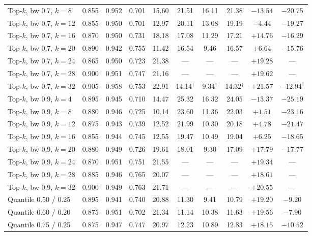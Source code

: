 \documentclass[12pt,parskip = half, DIV=classic,listof=totoc]{scrartcl}
\begin{document}
\begin{table}[htbp]
\begin{tabular}{@{}lccccccccc@{}}
						Top-$k$, bw 0.7, $k=8$ & 0.855 & 0.952 & 0.701 & 15.60 & 21.51 & 16.11 & 21.38 & $-13.54$ & $-20.75$ \\
						Top-$k$, bw 0.7, $k=12$ & 0.855 & 0.950 & 0.701 & 12.97 & 20.11 & 13.08 & 19.19 & $-4.44$ & $-19.27$ \\
						Top-$k$, bw 0.7, $k=16$ & 0.870 & 0.950 & 0.731 & 18.18 & 17.08 & 11.29 & 17.21 & $+14.76$ & $-16.29$ \\
						Top-$k$, bw 0.7, $k=20$ & 0.890 & 0.942 & 0.755 & 11.42 & 16.54 & 9.46 & 16.57 & $+6.64$ & $-15.76$ \\
						Top-$k$, bw 0.7, $k=24$ & 0.865 & 0.950 & 0.723 & 21.38 & --- & --- & --- & $+19.28$ & --- \\
						Top-$k$, bw 0.7, $k=28$ & 0.900 & 0.951 & 0.747 & 21.16 & --- & --- & --- & $+19.62$ & --- \\
						Top-$k$, bw 0.7, $k=32$ & 0.905 & 0.958 & 0.753 & 22.91 & 14.14$^\dagger$ & 9.34$^\dagger$ & 14.32$^\dagger$ & $+21.57$ & $-12.94^\dagger$ \\
						\midrule
						Top-$k$, bw 0.9, $k=4$ & 0.895 & 0.945 & 0.710 & 14.47 & 25.32 & 16.32 & 24.05 & $-13.37$ & $-25.19$ \\
						Top-$k$, bw 0.9, $k=8$ & 0.880 & 0.946 & 0.725 & 10.14 & 23.60 & 11.36 & 22.03 & $+1.51$ & $-23.16$ \\
						Top-$k$, bw 0.9, $k=12$ & 0.875 & 0.943 & 0.739 & 12.52 & 21.99 & 10.30 & 20.18 & $+4.78$ & $-21.47$ \\
						Top-$k$, bw 0.9, $k=16$ & 0.855 & 0.944 & 0.745 & 12.55 & 19.47 & 10.49 & 19.04 & $+6.25$ & $-18.65$ \\
						Top-$k$, bw 0.9, $k=20$ & 0.880 & 0.949 & 0.726 & 19.61 & 18.01 & 9.30 & 17.09 & $+17.79$ & $-17.77$ \\
						Top-$k$, bw 0.9, $k=24$ & 0.870 & 0.951 & 0.751 & 21.55 & --- & --- & --- & $+19.34$ & --- \\
						Top-$k$, bw 0.9, $k=28$ & 0.885 & 0.946 & 0.765 & 20.07 & --- & --- & --- & $+18.61$ & --- \\
						Top-$k$, bw 0.9, $k=32$ & 0.900 & 0.949 & 0.763 & 21.71 & --- & --- & --- & $+20.55$ & --- \\
						\midrule
						Quantile 0.50 / 0.25 & 0.895 & 0.941 & 0.740 & 20.88 & 11.30 & 9.41 & 10.79 & $+19.20$ & $-9.20$ \\
						Quantile 0.60 / 0.20 & 0.875 & 0.951 & 0.702 & 21.34 & 11.14 & 10.38 & 11.63 & $+19.56$ & $-7.90$ \\
						Quantile 0.75 / 0.25 & 0.875 & 0.947 & 0.747 & 20.97 & 12.23 & 10.89 & 12.83 & $+18.15$ & $-10.52$ \\

\end{tabular}
\end{table}
\end{document}
